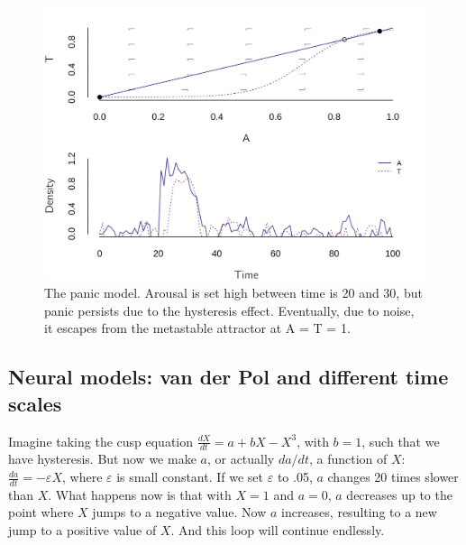 \documentclass[
  a4paper,
  DIV=11,
  numbers=noendperiod]{scrreprt}
\begin{document}
\begin{figure}

{\centering \includegraphics{media/ch4n/fig-ch4n-img13-old-61.png}

}

\caption{\label{fig-ch4n-img13-old-61}The panic model. Arousal is set
high between time is 20 and 30, but panic persists due to the hysteresis
effect. Eventually, due to noise, it escapes from the metastable
attractor at A = T = 1.}

\end{figure}

\hypertarget{sec-Neural-models-van-der-Pol-and-different-time-scales}{%
\subsection{Neural models: van der Pol and different time
scales}\label{sec-Neural-models-van-der-Pol-and-different-time-scales}}

Imagine taking the cusp equation \(\frac{dX}{dt} = {a + bX - X}^{3}\),
with \(b=1\), such that we have hysteresis. But now we make \(a\), or
actually \(da/dt\), a function of \(X\):
\(\frac{da}{dt} = - \varepsilon X\), where \(\varepsilon\) is small
constant. If we set \(\varepsilon\) to .05, \(a\) changes 20 times
slower than \(X\). What happens now is that with \(X = 1\) and
\(a = 0\), \(a\) decreases up to the point where \(X\) jumps to a
negative value. Now \(a\) increases, resulting to a new jump to a
positive value of \(X\). And this loop will continue endlessly.
\end{document}
